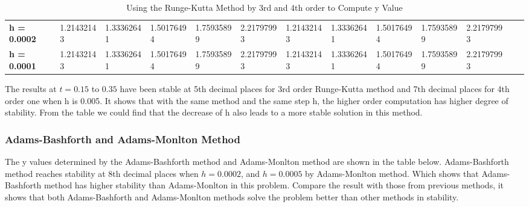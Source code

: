 \documentclass[a4paper]{article}
\begin{document}
\begin{table}[H]
{\begin{tabular}{@{}lllllllllllll@{}}
				\textbf{h = 0.0002}             & 1.21432143                & 1.33362641                            & 1.50176494                            & 1.75935899                            & 2.21797993                                                         & 1.21432143                             & 1.33362641                            & 1.50176494                            & 1.75935899       & 2.21797993               \\
				\textbf{h = 0.0001}             & 1.21432143                             & 1.33362641                            & 1.50176494                            & 1.75935899                            & 2.21797993                                                         & 1.21432143                             & 1.33362641                            & 1.50176494                            & 1.75935899       & 2.21797993              \\
				\bottomrule
			\end{tabular}%
		}
		\caption{Using the Runge-Kutta Method by 3rd and 4th order to Compute y Value}
		\label{tab:IVP2_RK}
	\end{table}
	
	The results at $t = 0.15$ to $0.35$ have been stable at 5th decimal places for 3rd order Runge-Kutta method and 7th decimal places for 4th order one when h is 0.005. It shows that with the same method and the same step h, the higher order computation has higher degree of stability. From the table we could find that the decrease of h also leads to a more stable solution in this method. 
	
	\subsubsection{Adams-Bashforth and Adams-Monlton Method}
	
	The y values determined by the Adams-Bashforth method and Adams-Monlton method are shown in the table below. Adams-Bashforth method reaches stability at 8th decimal places when $h = 0.0002$, and $h = 0.0005$ by Adams-Monlton method. Which shows that Adams-Bashforth method has higher stability than Adams-Monlton in this problem. Compare the result with those from previous methods, it shows that both Adams-Bashforth and Adams-Monlton methods solve the problem better than other methods in stability.
	
\end{document}
